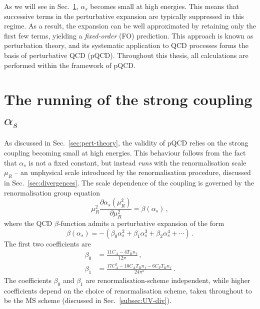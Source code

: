 As we will see in Sec.~\ref{sec:running-coupling}, $\alpha_s$ becomes small at
high energies. This means that successive terms in the perturbative expansion
are typically suppressed in this regime. As a result, the expansion can be well
approximated by retaining only the first few terms, yielding a \emph{fixed-order}
(FO) prediction. This approach is known as perturbation theory, and its
systematic application to QCD processes forms the basis of perturbative QCD
(pQCD). Throughout this thesis, all calculations are performed within the
framework of pQCD.

\section{The running of the strong coupling $\alpha_s$}
\label{sec:running-coupling}

As discussed in Sec.~\ref{sec:pert-theory}, the validity of pQCD 
relies on the strong coupling becoming small at high energies. 
This behaviour follows from the fact that $\alpha_s$ is not a fixed constant,
but instead \emph{runs} with the renormalisation scale $\mu_R$ 
-- an unphysical scale introduced by the renormalisation procedure, discussed in Sec.~\ref{sec:divergences}. 
The scale dependence of the coupling is governed by the renormalisation group equation
\begin{equation}
\label{eq:coupling-DE}
    \mu_R^2 \frac{\partial \alpha_s(\mu_R^2)}{\partial \mu_R^2} = \beta(\alpha_s)\,,
\end{equation}
where the QCD $\beta$-function admits a perturbative expansion of the form
\begin{equation}
    \beta(\alpha_s) = -\left(\beta_0\alpha_s^2 + \beta_1\alpha_s^3 + \beta_2\alpha_s^4 + \cdots\right)\,.
\end{equation}
The first two coefficients are
\begin{subequations}
\label{eq:beta}
\begin{align}
\label{eq:beta0}
    \beta_0 &= \frac{11 C_A - 4T_Rn_f}{12\pi}\,,\\[1em]
    \label{eq:beta1}
   \beta_1 &= \frac{17C_A^2 - 10C_A T_R n_f - 6C_F T_Rn_f}{24\pi^2}\,.
\end{align}
\end{subequations}
The coefficients $\beta_0$ and $\beta_1$ are renormalisation-scheme
independent, while higher coefficients depend on the choice of
renormalisation scheme, taken throughout to be the $\overline{\mathrm{MS}}$
scheme (discussed in Sec.~\ref{subsec:UV-div}).

